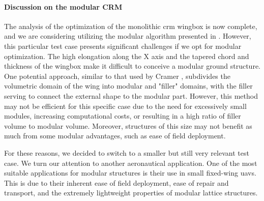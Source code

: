 \paragraph{Discussion on the modular CRM}
The analysis of the optimization of the monolithic \gls{crm} wingbox is now complete, and we are considering utilizing the modular algorithm presented in . However, this particular test case presents significant challenges if we opt for modular optimization. The high elongation along the X axis and the tapered chord and thickness of the wingbox make it difficult to conceive a modular ground structure. One potential approach, similar to that used by Cramer \etal {}, subdivides the volumetric domain of the wing into modular and "filler" domains, with the filler serving to connect the external shape to the modular part. However, this method may not be efficient for this specific case due to the need for excessively small modules, increasing computational costs, or resulting in a high ratio of filler volume to modular volume. Moreover, structures of this size may not benefit as much from some modular advantages, such as ease of field deployment.

For these reasons, we decided to switch to a smaller but still very relevant test case. We turn our attention to another aeronautical application. One of the most suitable applications for modular structures is their use in small fixed-wing \glspl{uav}. This is due to their inherent ease of field deployment, ease of repair and transport, and the extremely lightweight properties of modular lattice structures.

